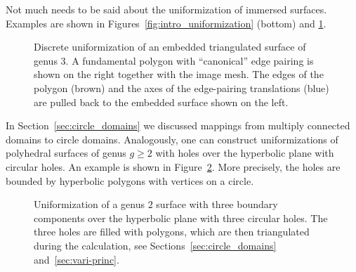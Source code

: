 \documentclass[Thesis]{subfiles}
\begin{document}
Not much needs to be said about the uniformization of immersed
surfaces. Examples are shown in Figures~\ref{fig:intro_uniformization}
(bottom) and \ref{fig:embedded_genus_3}.
\begin{figure}
\centering
{}
\caption{Discrete uniformization of an embedded triangulated surface
  of genus $3$. A fundamental polygon with ``canonical'' edge pairing
  is shown on the right together with the image mesh. The edges of the
  polygon (brown) and the axes of the edge-pairing translations (blue)
  are pulled back to the embedded surface shown on the left.}
\label{fig:embedded_genus_3}
\end{figure}
In Section~\ref{sec:circle_domains} we discussed mappings from
multiply connected domains to circle domains. Analogously, one can
construct uniformizations of polyhedral surfaces of genus $g\geq 2$
with holes over the hyperbolic plane with circular holes. An example
is shown in Figure~\ref{fig:hyperbolic_circle_domain}. More precisely,
the holes are bounded by hyperbolic polygons with vertices on a
circle. 
\begin{figure}
\centering
{}
\caption{ Uniformization of a genus $2$ surface with three boundary
  components over the hyperbolic plane with three circular holes. The
  three holes are filled with polygons, which are then triangulated
  during the calculation, see Sections~\ref{sec:circle_domains}
  and~\ref{sec:vari-princ}.  }
\label{fig:hyperbolic_circle_domain}
\end{figure}
\end{document}
